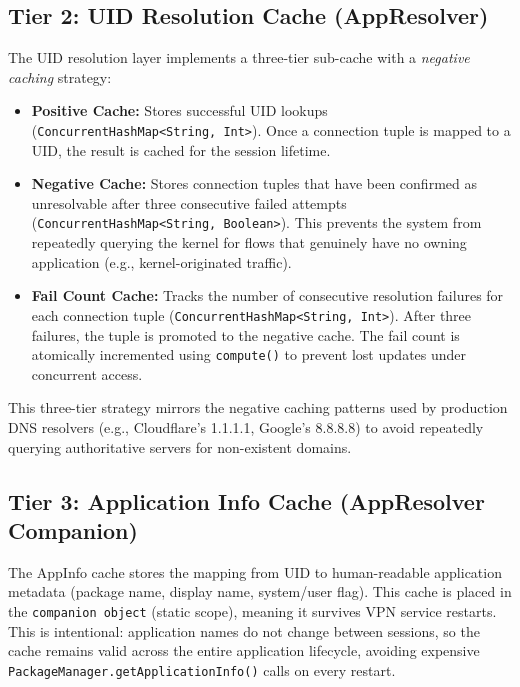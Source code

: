 \subsection{Tier 2: UID Resolution Cache (AppResolver)}

The UID resolution layer implements a three-tier sub-cache with a \textit{negative caching} strategy:

\begin{itemize}[noitemsep]
    \item \textbf{Positive Cache:} Stores successful UID lookups (\texttt{ConcurrentHashMap<String, Int>}). Once a connection tuple is mapped to a UID, the result is cached for the session lifetime.
    \item \textbf{Negative Cache:} Stores connection tuples that have been confirmed as unresolvable after three consecutive failed attempts (\texttt{ConcurrentHashMap<String, Boolean>}). This prevents the system from repeatedly querying the kernel for flows that genuinely have no owning application (e.g., kernel-originated traffic).
    \item \textbf{Fail Count Cache:} Tracks the number of consecutive resolution failures for each connection tuple (\texttt{ConcurrentHashMap<String, Int>}). After three failures, the tuple is promoted to the negative cache. The fail count is atomically incremented using \texttt{compute()} to prevent lost updates under concurrent access.
\end{itemize}

This three-tier strategy mirrors the negative caching patterns used by production DNS resolvers (e.g., Cloudflare's 1.1.1.1, Google's 8.8.8.8) to avoid repeatedly querying authoritative servers for non-existent domains.

\subsection{Tier 3: Application Info Cache (AppResolver Companion)}

The AppInfo cache stores the mapping from UID to human-readable application metadata (package name, display name, system/user flag). This cache is placed in the \texttt{companion object} (static scope), meaning it survives VPN service restarts. This is intentional: application names do not change between sessions, so the cache remains valid across the entire application lifecycle, avoiding expensive \texttt{PackageManager.getApplicationInfo()} calls on every restart.

